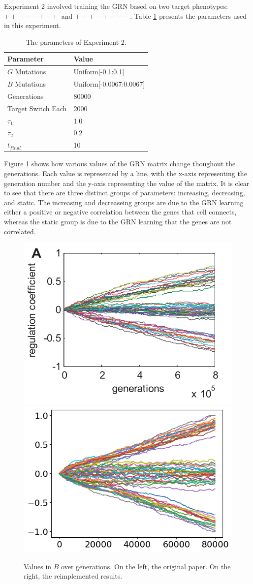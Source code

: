 \documentclass[twocolumn,a4paper,11pt]{article}
\begin{document}
    Experiment 2 involved training the GRN based on two target phenotypes: $++---+-+$ and $+-+-+---$. Table \ref{tbl:ex2-param} presents the parameters used in this experiment.

    \begin{table}[h]
        \centering
        \begin{tabular}{l|l}
        Parameter & Value \\ \hline
        $G$ Mutations & Uniform[-0.1:0.1] \\
        $B$ Mutations & Uniform[-0.0067:0.0067] \\
        Generations & 80000 \\
        Target Switch Each & 2000 \\
        $\tau_1$ & 1.0 \\
        $\tau_2$ & 0.2 \\
        $t_{final}$ & 10
        \end{tabular}
        \caption{The parameters of Experiment 2.} \label{tbl:ex2-param}
    \end{table}

    Figure \ref{fig:2a} shows how various values of the GRN matrix change thoughout the generations. Each value is represented by a line, with the x-axis representing the generation number and the y-axis representing the value of the matrix. It is clear to see that there are three distinct groups of parameters: increasing, decreasing, and static. The increasing and decreaseing groups are due to the GRN learning either a positive or negative correlation between the genes that cell connects, whereas the static group is due to the GRN learning that the genes are not correlated.
    \begin{figure}[h]
        \centering
        \includegraphics[width=0.48\linewidth]{orig_img/fig2a.png}
        \includegraphics[width=0.48\linewidth]{img/fig2a.png}
        \caption{Values in $B$ over generations. On the left, the original paper. On the right, the reimplemented results.} \label{fig:2a}
    \end{figure}
\end{document}
